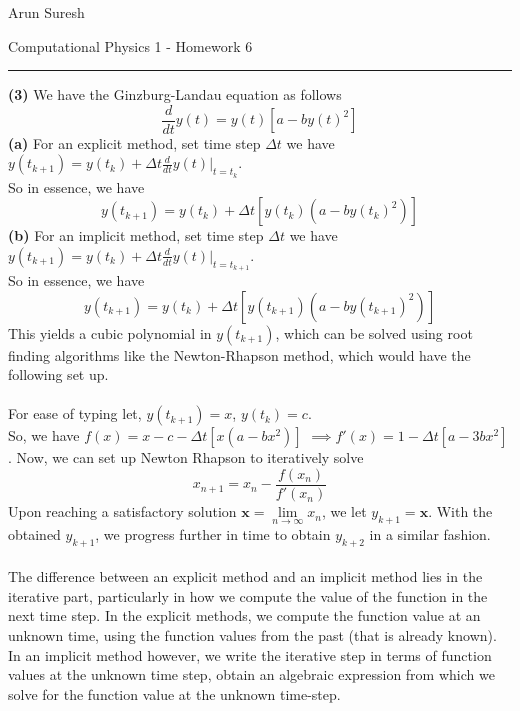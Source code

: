 \documentclass[12pt]{article}
\begin{document}
	Arun Suresh
	\begin{center}
		Computational Physics 1 - Homework 6
	\end{center} 
	{\rule{\linewidth}{0.1mm} }



\noindent \textbf{(3)} We have the Ginzburg-Landau equation as follows $$\frac{d}{dt}y(t) = y(t)[a - by(t)^2]$$
\noindent \textbf{(a)} For an explicit method, set time step $\Delta t$ we have $y(t_{k+1}) = y(t_k) +\Delta t\frac{d}{dt}y(t) \bigg|_{t = t_k}$. \\ \indent So in essence, we have $$y(t_{k+1}) = y(t_k) + \Delta t[y(t_k)(a-by(t_k)^2)]$$
\textbf{(b)} For an implicit method, set time step $\Delta t$ we have $y(t_{k+1}) = y(t_k) +\Delta t\frac{d}{dt}y(t) \bigg|_{t = t_{k+1}}$. \\ \indent So in essence, we have $$y(t_{k+1}) = y(t_k) + \Delta t[y(t_{k+1})(a-by(t_{k+1})^2)]$$ This yields a cubic polynomial in $y(t_{k+1})$, which can be solved using root finding algorithms like the Newton-Rhapson method, which would have the following set up.\\\\
For ease of typing let, $y(t_{k+1}) = x$, $y(t_k) = c$. \\ So, we have $f(x) = x - c - \Delta t[x(a-bx^2)]$ $\implies f'(x) = 1 - \Delta t[a-3bx^2]$. 
Now, we can set up Newton Rhapson to iteratively solve $$x_{n+1} = x_n - \frac{f(x_n)}{f'(x_n)}$$ Upon reaching a satisfactory solution $\textbf{x} = \lim\limits_{n \rightarrow \infty} x_n$, we let $y_{k+1} = \textbf{x}$. With the obtained $y_{k+1}$, we progress further in time to obtain $y_{k+2}$ in a similar fashion. \\\\

The difference between an explicit method and an implicit method lies in the iterative part, particularly in how we compute the value of the function in the next time step. In the explicit methods, we compute the function value at an unknown time, using the function values from the past (that is already known). In an implicit method however, we write the iterative step in terms of function values at the unknown time step, obtain an algebraic expression from which we solve for the function value at the unknown time-step.  

\newpage
\end{document}
